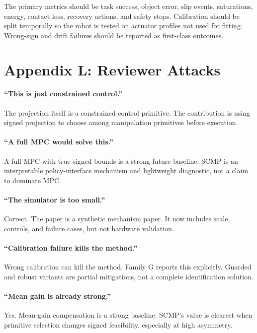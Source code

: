 \documentclass{article}
\begin{document}
The primary metrics should be task success, object error, slip events, saturations, energy, contact loss, recovery actions, and safety stops. Calibration should be split temporally so the robot is tested on actuator profiles not used for fitting. Wrong-sign and drift failures should be reported as first-class outcomes.

\section{Appendix L: Reviewer Attacks}

\paragraph{``This is just constrained control.''}
The projection itself is a constrained-control primitive. The contribution is using signed projection to choose among manipulation primitives before execution.

\paragraph{``A full MPC would solve this.''}
A full MPC with true signed bounds is a strong future baseline. SCMP is an interpretable policy-interface mechanism and lightweight diagnostic, not a claim to dominate MPC.

\paragraph{``The simulator is too small.''}
Correct. The paper is a synthetic mechanism paper. It now includes scale, controls, and failure cases, but not hardware validation.

\paragraph{``Calibration failure kills the method.''}
Wrong calibration can kill the method. Family G reports this explicitly. Guarded and robust variants are partial mitigations, not a complete identification solution.

\paragraph{``Mean gain is already strong.''}
Yes. Mean-gain compensation is a strong baseline. SCMP's value is clearest when primitive selection changes signed feasibility, especially at high asymmetry.
\end{document}
